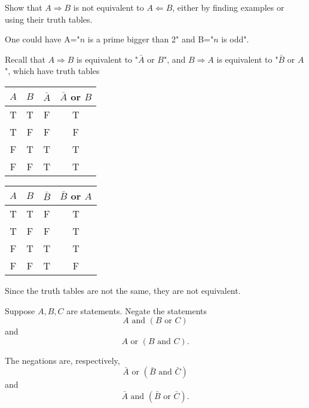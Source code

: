 \documentclass[11pt,dvipsnames]{book}
\numberwithin{figure}{section} %
\numberwithin{table}{section} %
\begin{document}
\begin{exercise}
Show that $A\Rightarrow B$ is not equivalent to $A\Leftarrow B$, either by finding examples or using their truth tables. 
\begin{solution}
One could have A="$n$ is a prime bigger than 2" and B="$n$ is odd". 

Recall that $A\Rightarrow B$ is equivalent to "$\bar{A}$ or $B$", and  $B\Rightarrow A$ is equivalent to "$\bar{B}$ or $A$", which have truth tables
\begin{center}
\begin{multicols}{2}
\begin{tabular}{ c|c|c|c}
$A$ & $B$ & $\bar{A}$ & $\bar{A}$ or ${B}$  \\ \hline 
T & T & F  & T \\
T & F & F  & F \\
F & T & T  & T \\
F & F &  T  &  T \\
\end{tabular}

\begin{tabular}{ c|c|c|c}
$A$ & $B$ & $\bar{B}$ & $\bar{B}$ or ${A}$  \\ \hline 
T & T & F  & T \\
T & F & F  & T \\
F & T & T  & T \\
F & F &  T  &  F \\
\end{tabular}


\end{multicols}
Since the truth tables are not the same, they are not equivalent.

\end{center}

\end{solution}
\end{exercise}






\begin{exercise}
Suppose $A,B,C$ are statements. Negate the statements
\[
A\mbox{ and }(B \mbox{ or }C)\]
and 
\[
A\mbox{ or }(B \mbox{ and }C)
.
\]
\begin{solution}
The negations are, respectively,
\[
\bar{A} \mbox{ or } (\bar{B}\mbox{ and }\bar{C})
\]
and
\[
\bar{A} \mbox{ and } (\bar{B}\mbox{ or }\bar{C}).
\]
\end{solution}

\end{exercise}
\end{document}
